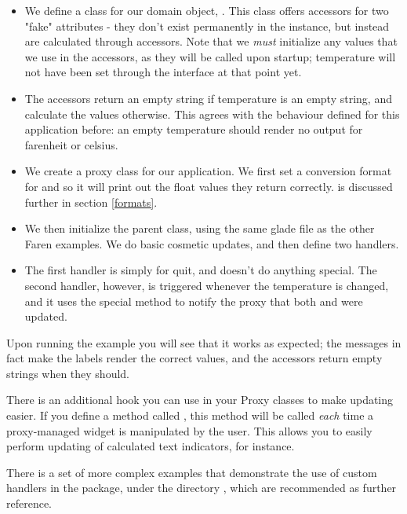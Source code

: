 \documentclass[a4paper]{howto}
\begin{document}
\begin{itemize}
\item We define a class for our domain object, . This
class offers accessors for two "fake" attributes - they don't exist
permanently in the instance, but instead are calculated through
accessors. Note that we {\it must} initialize any values that we use in
the accessors, as they will be called upon startup; temperature will not
have been set through the interface at that point yet.

\item The accessors return an empty string if temperature is an empty
string, and calculate the values otherwise. This agrees with the
behaviour defined for this application before: an empty temperature
should render no output for farenheit or celsius.

\item We create a proxy class for our application.  We first set a
conversion format for  and  so it will
print out the float values they return correctly. 
is discussed further in section \ref{formats}.

\item We then initialize the parent class, using the same glade file as
the other Faren examples. We do basic cosmetic updates, and then define
two handlers.

\item The first handler is simply for quit, and doesn't do anything
special. The second handler, however, is triggered whenever the
temperature is changed, and it uses the special  method
to notify the proxy that both  and  were
updated.

\end{itemize}

Upon running the example you will see that it works as expected;
the  messages in fact make the labels render the correct
values, and the accessors return empty strings when they should.

There is an additional hook you can use in your Proxy classes to make
updating easier. If you define a method called ,
this method will be called {\it each} time a proxy-managed widget is
manipulated by the user. This allows you to easily perform updating of
calculated text indicators, for instance.

There is a set of more complex examples that demonstrate the use of
custom handlers in the package, under the directory
, which are recommended as further reference.
\end{document}
